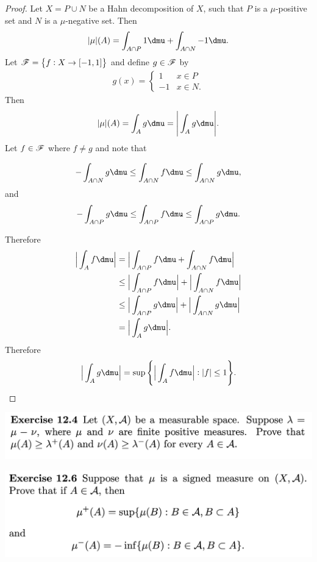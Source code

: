 \begin{proof}
  Let $X = P \cup N$ be a Hahn decomposition of $X$, such that $P$ is a $\mu$-positive set and $N$ is
  a $\mu$-negative set. Then
  \begin{align*}
    |\mu|(A) =\int_{A\cap P} 1 \dmu + \int_{A \cap N} -1 \dmu.
  \end{align*}
  Let $\mathscr F = \big\{f: X \to [-1, 1]\big\}$ and define $g \in \mathscr F$ by
  \begin{align*}
    g(x) =
    \begin{cases}
      1  & x \in P \\
      -1 & x \in N.
    \end{cases}
  \end{align*}
  Then
  \begin{align*}
    |\mu|(A) = \int_A g \dmu = \Bigg|\int_A g \dmu\Bigg|.
  \end{align*}
  Let $f \in \mathscr F$ where $f \neq g$ and note that

  \begin{align*}
    -\int_{A \cap N} g \dmu \leq \int_{A \cap N} f \dmu \leq \int_{A \cap N} g \dmu,
  \end{align*}
  and
  \begin{align*}
    -\int_{A \cap P} g \dmu \leq \int_{A \cap P} f \dmu \leq \int_{A \cap P} g \dmu.
  \end{align*}

  Therefore
  \begin{align*}
    \Big|\int_A f \dmu\Big|
    &= \Big|\int_{A \cap P} f \dmu + \int_{A \cap N} f \dmu\Big| \\
    &\leq \Big|\int_{A \cap P} f \dmu\Big| + \Big|\int_{A \cap N} f \dmu\Big| \\
    &\leq \Big|\int_{A \cap P} g \dmu\Big| + \Big|\int_{A \cap N} g \dmu\Big| \\
    &= \Big|\int_{A} g \dmu\Big|.
  \end{align*}
  Therefore
  \begin{align*}
    \Big|\int_{A} g \dmu\Big| = \sup\Bigg\{ \Big|\int_A f \dmu\Big| : |f| \leq 1 \Bigg\}.
  \end{align*}
\end{proof}


\newpage
\begin{mdframed}
\includegraphics[width=400pt]{img/analysis--berkeley-202a-hw10-8336.png}
\end{mdframed}

\newpage
\begin{mdframed}
\includegraphics[width=400pt]{img/analysis--berkeley-202a-hw10-0220.png}
\end{mdframed}

